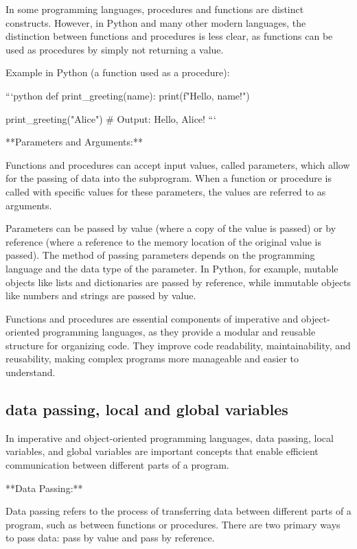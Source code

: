 \documentclass{article}
\begin{document}
In some programming languages, procedures and functions are distinct constructs. However, in Python and many other modern languages, the distinction between functions and procedures is less clear, as functions can be used as procedures by simply not returning a value.

Example in Python (a function used as a procedure):

```python
def print_greeting(name):
    print(f"Hello, {name}!")

print_greeting("Alice")  # Output: Hello, Alice!
```

**Parameters and Arguments:**

Functions and procedures can accept input values, called parameters, which allow for the passing of data into the subprogram. When a function or procedure is called with specific values for these parameters, the values are referred to as arguments.

Parameters can be passed by value (where a copy of the value is passed) or by reference (where a reference to the memory location of the original value is passed). The method of passing parameters depends on the programming language and the data type of the parameter. In Python, for example, mutable objects like lists and dictionaries are passed by reference, while immutable objects like numbers and strings are passed by value.

Functions and procedures are essential components of imperative and object-oriented programming languages, as they provide a modular and reusable structure for organizing code. They improve code readability, maintainability, and reusability, making complex programs more manageable and easier to understand.


\subsection{data passing, local and global variables}

In imperative and object-oriented programming languages, data passing, local variables, and global variables are important concepts that enable efficient communication between different parts of a program.

**Data Passing:**

Data passing refers to the process of transferring data between different parts of a program, such as between functions or procedures. There are two primary ways to pass data: pass by value and pass by reference.
\end{document}
